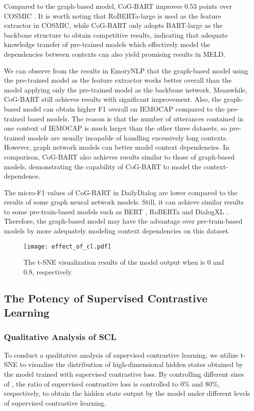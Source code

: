 \documentclass[letterpaper]{article} \usepackage{aaai22}  \usepackage{times}  \usepackage{helvet}  \usepackage{courier}  \usepackage[hyphens]{url}  \usepackage{graphicx} \urlstyle{rm} \def\UrlFont{\rm}  \usepackage{natbib}  \usepackage{caption} \DeclareCaptionStyle{ruled}{labelfont=normalfont,labelsep=colon,strut=off} \frenchspacing  \setlength{\pdfpagewidth}{8.5in}  \setlength{\pdfpageheight}{11in}  \usepackage{algorithm}
\begin{document}
Compared to the graph-based model, CoG-BART improves 0.53 points over COSMIC \cite{ghosal-etal-2020-cosmic}. It is worth noting that RoBERTa-large is used as the feature extractor in COSMIC, while CoG-BART only adopts BART-large as the backbone structure to obtain competitive results, indicating that adequate knowledge transfer of pre-trained models which  effectively model the dependencies between contexts can also yield promising results in MELD.

We can observe from the results in EmoryNLP \cite{emorynlp} that the graph-based model using the pre-trained model as the feature extractor works better overall than the model applying only the pre-trained model as the backbone network. Meanwhile, CoG-BART still achieves results with significant improvement. Also, the graph-based model can obtain higher F1 overall on IEMOCAP \cite{busso2008iemocap} compared to the pre-trained based models. The reason is that the number of utterances contained in one context of IEMOCAP is much larger than the other three datasets, so pre-trained models are usually incapable of handling excessively long contexts. However, graph network models can better model context dependencies. In comparison, CoG-BART also achieves results similar to those of graph-based models, demonstrating the capability of CoG-BART to model the context-dependence.

The micro-F1 values of CoG-BART in DailyDialog are lower compared to the results of some graph neural network models. Still, it can achieve similar results to some pre-train-based models such as BERT \cite{devlin-etal-2019-bert}, RoBERTa \cite{roberta} and DialogXL \cite{dialog-xl}. Therefore, the graph-based model may have the advantage over pre-train-based models by more adequately modeling context dependencies on this dataset.


\begin{figure}[t]
\centering
\texttt{[image: effect\_of\_cl.pdf]} \caption{The t-SNE visualization results of the model output when  is 0 and 0.8, respectively.}
\label{effect_of_scl}
\end{figure}

\subsection{The Potency of Supervised Contrastive Learning}
\subsubsection{Qualitative Analysis of SCL}
To conduct a qualitative analysis of supervised contrastive learning, we utilize t-SNE \cite{t-sne-2002} to visualize the distribution of high-dimensional hidden states obtained by the model trained with supervised contrastive loss. By controlling different sizes of , the ratio of supervised contrastive loss is controlled to 0\% and 80\%, respectively, to obtain the hidden state output by the model under different levels of supervised contrastive learning.
\end{document}
